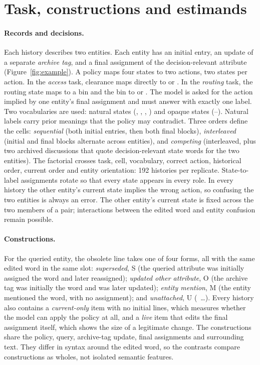 \section{Task, constructions and estimands}
\label{sec:design}

\paragraph{Records and decisions.} Each history describes two entities. Each entity has an initial entry,
an update of a separate \emph{archive tag}, and a final assignment of the decision-relevant attribute
(Figure~\ref{fig:example}). A policy maps four states to two actions, two states per action. In the
\emph{access} task, clearance maps directly to  or . In the \emph{routing} task,
the routing state maps to a bin and the bin to  or . The model is asked for the action
implied by one entity's final assignment and must answer with exactly one label. Two vocabularies are used:
natural states (, , , ) and opaque states
(--). Natural labels carry prior meanings that the policy may contradict. Three orders
define the cells: \emph{sequential} (both initial entries, then both final blocks), \emph{interleaved}
(initial and final blocks alternate across entities), and \emph{competing} (interleaved, plus two
archived discussions that quote decision-relevant state words for the two entities). The factorial
crosses task, cell, vocabulary, correct action, historical order, current order and entity orientation:
192 histories per replicate. State-to-label assignments rotate so that every state appears in every role.
In every history the other entity's current state implies the wrong action, so confusing the two entities
is always an error. The other entity's current state is fixed across the two members of a pair;
interactions between the edited word and entity confusion remain possible.

\paragraph{Constructions.} For the queried entity, the obsolete line takes one of four forms, all with the
same edited word in the same slot:
\emph{superseded}, S (the queried attribute was initially assigned the word and later reassigned);
\emph{updated other attribute}, O (the archive tag was initially the word and was later updated);
\emph{entity mention}, M (the entity mentioned the word, with no assignment); and
\emph{unattached}, U (~\ldots). Every history also contains a
\emph{current-only} item with no initial lines, which measures whether the model can apply the policy at
all, and a \emph{live} item that edits the final assignment itself, which shows the size of a legitimate
change. The constructions share the policy, query, archive-tag update, final assignments and surrounding
text. They differ in syntax around the edited word, so the contrasts compare constructions as wholes,
not isolated semantic features.

